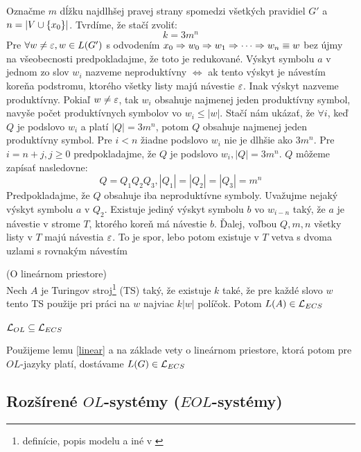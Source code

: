 \begin{dokaz}
  Označme $m$ dĺžku najdlhšej pravej strany spomedzi všetkých
  pravidiel $G'$ a $n=|V\cup\{x_0\}|$. Tvrdíme, že stačí zvoliť:
  \[
  k=3m^n
  \]
  Pre $\forall w\neq\varepsilon,w\in L(G')$ s odvodením $x_0\Rightarrow
  w_0\Rightarrow w_1\Rightarrow\cdots\Rightarrow w_n\equiv w$ bez újmy na všeobecnosti
  predpokladajme, že toto je redukované. Výskyt symbolu $a$ v jednom
  zo slov $w_i$ nazveme neproduktívny $\Longleftrightarrow$ ak tento
  výskyt je návestím koreňa podstromu, ktorého všetky listy majú
  návestie $\varepsilon$. Inak výskyt nazveme produktívny. Pokiaľ
  $w\neq\varepsilon$, tak $w_i$ obsahuje najmenej jeden produktívny
  symbol, navyše počet produktívnych symbolov vo $w_i\leq|w|$. Stačí
  nám ukázať, že $\forall i$, keď $Q$ je podslovo $w_i$ a platí
  $|Q|=3m^n$, potom $Q$ obsahuje najmenej jeden produktívny symbol.
  Pre $i<n$ žiadne podslovo $w_i$ nie je dlhšie ako $3m^n$. Pre
  $i=n+j,j\geq0$ predpokladajme, že $Q$ je podslovo $w_i,|Q|=3m^n$.
  $Q$ môžeme zapísať nasledovne:
  \[
  Q=Q_1Q_2Q_3,|Q_1|=|Q_2|=|Q_3|=m^n
  \]
  Predpokladajme, že $Q$ obsahuje iba neproduktívne symboly.
  Uvažujme nejaký výskyt symbolu $a$ v $Q_2$. Existuje jediný výskyt
  symbolu $b$ vo $w_{i-n}$ taký, že $a$ je návestie v strome $T$,
  ktorého koreň má návestie $b$. Ďalej, voľbou $Q,m,n$ všetky listy
  v $T$ majú návestia $\varepsilon$. To je spor, lebo potom existuje
  v $T$ vetva s dvoma uzlami s rovnakým návestím
\end{dokaz}

\begin{veta}
  (O lineárnom priestore)
  \\ Nech $A$ je Turingov
  stroj\footnote{definície, popis modelu a iné v \cite{Hopc}} (TS)
  taký, že existuje $k$ také, že pre každé slovo $w$ tento TS
  použije pri práci na $w$ najviac $k|w|$ políčok. Potom
  $L(A)\in\mathcal{L}_{ECS}$
\end{veta}

\begin{veta}
  $\mathcal{L}_{OL}\subseteq\mathcal{L}_{ECS}$
\end{veta}

\begin{dokaz}
  Použijeme lemu \ref{linear} a na základe vety o lineárnom
  priestore, ktorá potom pre $OL$-jazyky platí, dostávame
  $L(G)\in\mathcal{L}_{ECS}$
\end{dokaz}

\subsection {Rozšírené $OL$-systémy ($EOL$-systémy)}

